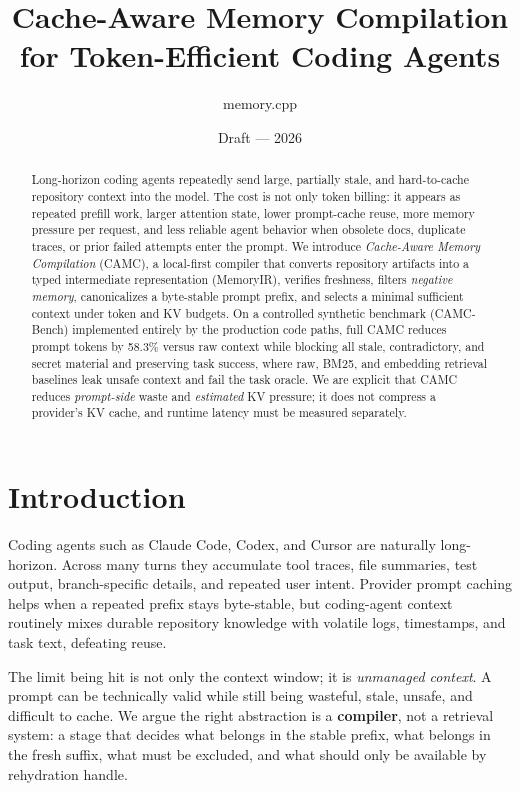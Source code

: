 \documentclass[11pt]{article}
\title{\textbf{Cache-Aware Memory Compilation for Token-Efficient Coding Agents}}
\author{memory.cpp}
\date{Draft --- 2026}
\begin{document}
\maketitle

\begin{abstract}
Long-horizon coding agents repeatedly send large, partially stale, and
hard-to-cache repository context into the model. The cost is not only token
billing: it appears as repeated prefill work, larger attention state, lower
prompt-cache reuse, more memory pressure per request, and less reliable agent
behavior when obsolete docs, duplicate traces, or prior failed attempts enter the
prompt. We introduce \emph{Cache-Aware Memory Compilation} (CAMC), a local-first
compiler that converts repository artifacts into a typed intermediate
representation (MemoryIR), verifies freshness, filters \emph{negative memory},
canonicalizes a byte-stable prompt prefix, and selects a minimal sufficient
context under token and KV budgets. On a controlled synthetic benchmark
(CAMC-Bench) implemented entirely by the production code paths, full CAMC reduces
prompt tokens by 58.3\% versus raw context while blocking all stale,
contradictory, and secret material and preserving task success, where raw, BM25,
and embedding retrieval baselines leak unsafe context and fail the task oracle.
We are explicit that CAMC reduces \emph{prompt-side} waste and \emph{estimated} KV
pressure; it does not compress a provider's KV cache, and runtime latency must be
measured separately.
\end{abstract}

\section{Introduction}

Coding agents such as Claude Code, Codex, and Cursor are naturally
long-horizon. Across many turns they accumulate tool traces, file summaries, test
output, branch-specific details, and repeated user intent. Provider prompt caching
helps when a repeated prefix stays byte-stable, but coding-agent context routinely
mixes durable repository knowledge with volatile logs, timestamps, and task text,
defeating reuse.

The limit being hit is not only the context window; it is \emph{unmanaged context}.
A prompt can be technically valid while still being wasteful, stale, unsafe, and
difficult to cache. We argue the right abstraction is a \textbf{compiler}, not a
retrieval system: a stage that decides what belongs in the stable prefix, what
belongs in the fresh suffix, what must be excluded, and what should only be
available by rehydration handle.
\end{document}
